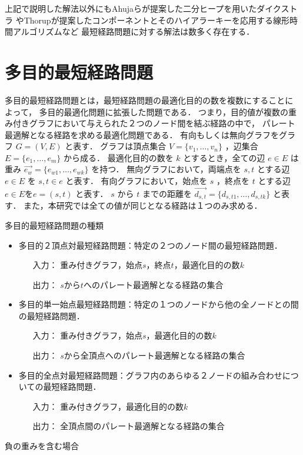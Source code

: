 \documentclass[12pt]{optlab-bachelor}
\begin{document}
上記で説明した解法以外にもAhujaら\cite{Ahuja}が提案した二分ヒープを用いたダイクストラ
やThorup\cite{Thorup}が提案したコンポーネントとそのハイアラーキーを応用する線形時間アルゴリズムなど
最短経路問題に対する解法は数多く存在する．

\section{多目的最短経路問題}
多目的最短経路問題とは，最短経路問題の最適化目的の数を複数にすることによって，
多目的最適化問題に拡張した問題である．
つまり，目的値が複数の重み付きグラフにおいて与えられた２つのノード間を結ぶ経路の中で，
パレート最適解となる経路を求める最適化問題である．
有向もしくは無向グラフをグラフ $G=(V,E)$ と表す．
グラフは頂点集合 $V=\{v_1,\ldots,v_n\}$ ，辺集合 $E=\{e_1,\ldots,e_m\}$ から成る．
最適化目的の数を $k$ とするとき，全ての辺 $e\in E$ は重み $\vec{e_w} = \{e_{w1},\ldots,e_{wk}\}$ を持つ．
無向グラフにおいて，両端点を $s,t$ とする辺 $e \in E$ を $s,t \in e$ と表す．
有向グラフにおいて，始点を $s$ ，終点を $t$ とする辺 $e \in E$を$e=(s,t)$ と表す．
$s$ から $t$ までの距離を $\vec{d_{s,t}} = \{d_{s,t1},\ldots,d_{s,tk}\}$ と表す．
また，本研究では全ての値が同じとなる経路は１つのみ求める．
\begin{description}
  \item[多目的最短経路問題の種類]
\end{description}
\begin{itemize}
\item 多目的２頂点対最短経路問題：特定の２つのノード間の最短経路問題．
  \begin{itemize}
    \item[入力：]重み付きグラフ，始点$s$，終点$t$，最適化目的の数$k$
    \item[出力：]$s$から$t$へのパレート最適解となる経路の集合
  \end{itemize}
  \item 多目的単一始点最短経路問題：特定の１つのノードから他の全ノードとの間の最短経路問題．
  \begin{itemize}
    \item[入力：]重み付きグラフ，始点$s$，最適化目的の数$k$
    \item[出力：]$s$から全頂点へのパレート最適解となる経路の集合
  \end{itemize}
  \item 多目的全点対最短経路問題：グラフ内のあらゆる２ノードの組み合わせについての最短経路問題．
  \begin{itemize}
    \item[入力：]重み付きグラフ，最適化目的の数$k$
    \item[出力：]全頂点間のパレート最適解となる経路の集合
  \end{itemize}
\end{itemize}
\begin{description}
  \item[負の重みを含む場合]
\end{description}
\end{document}
